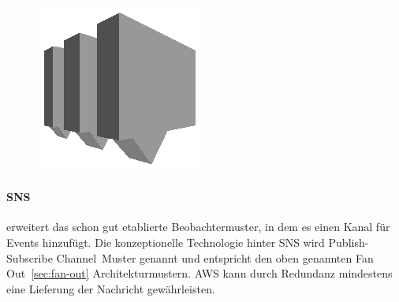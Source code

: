 \documentclass[
12pt,
english,
ngerman,
headsepline,
twoside,
openright,
numbers=noenddot,version=first
]{scrreprt}
\begin{document}
\begin{figure}
	\includegraphics[width=0.9\linewidth]{./pics/aws/Messaging_GRAYSCALE_AmazonSNS.eps}
\end{figure}
\paragraph{\acrfull{SNS}}\label{par:sns} erweitert das schon gut etablierte Beobachtermuster, in dem es einen Kanal für Events hinzufügt. Die konzeptionelle Technologie hinter \acrshort{SNS} wird \glqq Publish-Subscribe Channel\cite{patternIntegrationEnterprise}\grqq\ Muster genannt und entspricht den oben genannten \glqq Fan Out\grqq\ \ref{sec:fan-out} Architekturmustern. AWS kann durch Redundanz mindestens eine Lieferung der Nachricht gewährleisten.
\end{document}
